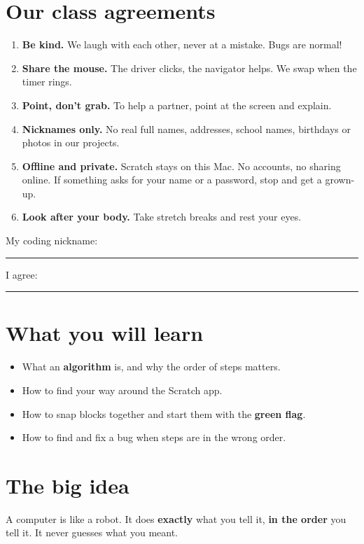 
\section{Our class agreements}
\begin{safety}
\begin{enumerate}[leftmargin=1.5em,itemsep=2pt]
  \item \textbf{Be kind.} We laugh with each other, never at a mistake. Bugs are normal!
  \item \textbf{Share the mouse.} The driver clicks, the navigator helps. We swap when the timer rings.
  \item \textbf{Point, don't grab.} To help a partner, point at the screen and explain.
  \item \textbf{Nicknames only.} No real full names, addresses, school names, birthdays or photos in our projects.
  \item \textbf{Offline and private.} Scratch stays on this Mac. No accounts, no sharing online. If something asks for your name or a password, stop and get a grown-up.
  \item \textbf{Look after your body.} Take stretch breaks and rest your eyes.
\end{enumerate}
\medskip
My coding nickname: \rule{5cm}{0.4pt}\qquad I agree: \rule{4cm}{0.4pt}
\end{safety}

\section{What you will learn}
\begin{itemize}[leftmargin=1.2em,itemsep=1pt]
  \item What an \textbf{algorithm} is, and why the order of steps matters.
  \item How to find your way around the Scratch app.
  \item How to snap blocks together and start them with the \textbf{green flag}.
  \item How to find and fix a bug when steps are in the wrong order.
\end{itemize}

\section{The big idea}
A computer is like a robot. It does \textbf{exactly} what you tell it, \textbf{in the order} you tell it. It never guesses what you meant.

